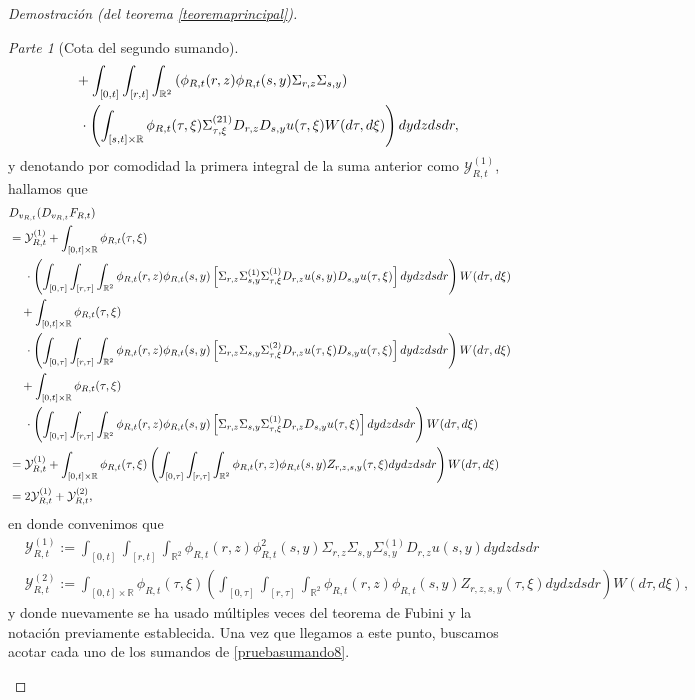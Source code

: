 \documentclass[letterpaper,twoside,12pt]{book}
\newcommand{\R}{\mathbb{R}}
\newcommand{\1}{\mathds{1}}
\theoremstyle{definition}
\theoremstyle{definition}
\theoremstyle{remark}
\newtheorem{proofpart}{Parte}
\theoremstyle{definition}
\theoremstyle{definition}
\theoremstyle{definition}
\theoremstyle{definition}
\theoremstyle{definition}
\begin{document}
\begin{proof}[Demostración (del teorema \ref{teoremaprincipal})]
\begin{proofpart}[Cota del segundo sumando]
\begin{align}
   &\ \ \ +\int_{[0,t]}\int_{[r,t]}\int_{\R^2}\left(\phi_{R,t}(r,z)\phi_{R,t}(s,y)\Sigma_{r,z}\Sigma_{s,y}\right)\notag\\
   &\ \ \ \ \cdot \left(\int_{[s,t]\times\R}\phi_{R,t}(\tau,\xi)\Sigma_{\tau,\xi}^{(21)}D_{r,z}D_{s,y}u(\tau,\xi)W(d\tau,d\xi)\right)dy dz ds dr,\notag
\end{align}
y denotando por comodidad la primera integral de la suma anterior como $\mathcal{Y}_{R,t}^{(1)}$, hallamos que 
\begin{align}
   &D_{v_{R,t}}(D_{v_{R,t}}F_{R,t})\notag\\
   &=\mathcal{Y}_{R,t}^{(1)}+\int_{[0,t]\times\R}\phi_{R,t}(\tau,\xi)\notag\\
   & \ \ \ \ \cdot \left(\int_{[0,\tau]}\int_{[r,\tau]}\int_{\R^2}\phi_{R,t}(r,z)\phi_{R,t}(s,y)\left[\Sigma_{r,z}\Sigma_{s,y}^{(1)}\Sigma_{\tau,\xi}^{(1)}D_{r,z}u(s,y)D_{s,y}u(\tau,\xi)\right]dy dz ds dr\right) W(d\tau,d\xi)\notag\\
   &\ \ \ +\int_{[0,t]\times\R}\phi_{R,t}(\tau,\xi)\notag\\
   &\ \ \ \ \cdot\left(\int_{[0,\tau]}\int_{[r,\tau]}\int_{\R^2}\phi_{R,t}(r,z)\phi_{R,t}(s,y)\left[\Sigma_{r,z}\Sigma_{s,y}\Sigma_{\tau,\xi}^{(2)}D_{r,z}u(\tau,\xi)D_{s,y}u(\tau,\xi)\right]dy dz ds dr\right) W(d\tau,d\xi)\notag\\
   &\ \ \ +\int_{[0,t]\times\R}\phi_{R,t}(\tau,\xi)\notag\\
   &\ \ \ \ \cdot\left(\int_{[0,\tau]}\int_{[r,\tau]}\int_{\R^2}\phi_{R,t}(r,z)\phi_{R,t}(s,y)\left[\Sigma_{r,z}\Sigma_{s,y}\Sigma_{\tau,\xi}^{(1)}D_{r,z}D_{s,y}u(\tau,\xi)\right]dy dz ds dr\right) W(d\tau,d\xi)\notag\\
   &=\mathcal{Y}_{R,t}^{(1)}+\int_{[0,t]\times\R}\phi_{R,t}(\tau,\xi)\left(\int_{[0,\tau]}\int_{[r,\tau]}\int_{\R^2}\phi_{R,t}(r,z)\phi_{R,t}(s,y)Z_{r,z,s,y}(\tau,\xi)dy dz ds dr\right)W(d\tau,d\xi)\notag\\
   &=2\mathcal{Y}_{R,t}^{(1)}+\mathcal{Y}_{R,t}^{(2)},\label{pruebasumando8}
\end{align}
en donde convenimos que
\begin{align*}
   &\mathcal{Y}_{R,t}^{(1)}:=\int_{[0,t]}\int_{[r,t]}\int_{\R^2}\phi_{R,t}(r,z)\phi_{R,t}^2(s,y)\Sigma_{r,z}\Sigma_{s,y}\Sigma^{(1)}_{s,y}D_{r,z}u(s,y)dy dz ds dr\\
   &\mathcal{Y}_{R,t}^{(2)}:=\int_{[0,t]\times\R}\phi_{R,t}(\tau,\xi)\left(\int_{[0,\tau]}\int_{[r,\tau]}\int_{\R^2}\phi_{R,t}(r,z)\phi_{R,t}(s,y)Z_{r,z,s,y}(\tau,\xi)dy dz ds dr\right)W(d\tau,d\xi),
\end{align*}
y donde nuevamente se ha usado múltiples veces del teorema de Fubini y la notación previamente establecida. Una vez que llegamos a este punto, buscamos acotar cada uno de los sumandos de \eqref{pruebasumando8}. 


\end{proofpart}
\end{proof}
\end{document}
